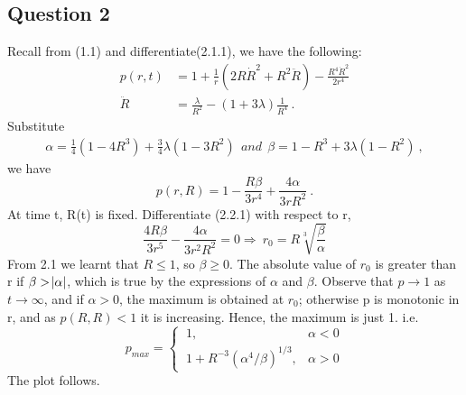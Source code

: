 \documentclass[11pt]{article}
\begin{document}
\subsection{Question 2}
Recall from (1.1) and differentiate(2.1.1), we have the following:
\begin{align*}
p(r,t) &=1+\frac{1}{r}\left(2R\dot{R}^2 + R^2\ddot{R}\right)-\frac{R^4\dot{R}^2}{2r^4} \tag{1.1}\\
\ddot{R}& = \frac{\lambda}{R^2}-(1+3\lambda)\frac{1}{R^4}\ .
\end{align*}
Substitute
\begin{align*}
\alpha = \frac{1}{4}\left(1-4R^3\right)+\frac{3}{4}\lambda\left(1-3R^2\right)\ \ and\ \ \beta = 1-R^3+3\lambda\left(1-R^2\right)\ ,
\end{align*} 
we have
\begin{equation*}       
p(r,R) = 1-\frac{R\beta}{3r^4}+\frac{4\alpha}{3rR^2}\ . \tag{2.2.1}
\end{equation*}
At time t, R(t) is fixed. Differentiate (2.2.1) with respect to r, 
$$\frac{4R\beta}{3r^5}-\frac{4\alpha}{3r^2 R^2}=0\Rightarrow\ r_{0} = R\sqrt[3]{\frac{\beta}{\alpha}}$$
From 2.1 we learnt that $R\leqslant 1$, so $\beta \geqslant 0$. 
The absolute value of  $r_{0}$ is greater than r if $\beta>\abs{\alpha}$, which is true by the expressions of $\alpha$ and $\beta$.\newline
Observe that $p \to 1$ as $t \to \infty$, and 
if $\alpha > 0$, the maximum is obtained at $r_{0}$; otherwise p is monotonic in r, and as $p(R,R)<1$ it is increasing. Hence, the maximum is just 1. i.e.
\[p_{max} = 
\begin{cases}
\ 1,     & \alpha<0\\
\ 1+R^{-3}\left(\alpha^4/\beta\right)^{1/3}, & \alpha>0
\end{cases}\]
The plot follows.
\end{document}
